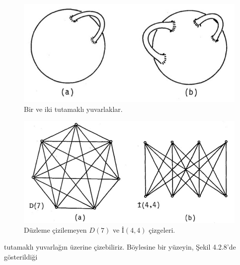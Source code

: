 \documentclass[11pt]{amsbook}
\begin{document}

\begin{figure}[htbp] \begin{center}
\includegraphics[width=1\textwidth]{images/ceyhun-203-fig01}
\caption{
Bir ve iki tutamaklı yuvarlaklar.
}
\label{fig:SuerDemirCovers} \end{center}
\end{figure}

\begin{figure}[htbp] \begin{center}
\includegraphics[width=1\textwidth]{images/ceyhun-203-fig02}
\caption{
Düzleme çizilemeyen $D(7)$ ve $İ(4,4)$ çizgeleri.
}
\label{fig:SuerDemirCovers} \end{center}
\end{figure}

\par 

tutamaklı yuvarlağın üzerine çizebiliriz. Böylesine bir yüzeyin, Şekil 4.2.8'de gösterildiği
\end{document}
